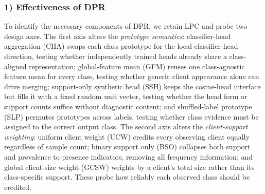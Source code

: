 \documentclass[letterpaper]{article} %
\begin{document}
\subsubsection{1) Effectiveness of DPR}
To identify the necessary components of DPR, we retain LPC and probe two design axes. The first axis alters the \emph{prototype semantics}: classifier-head aggregation (CHA) swaps each class prototype for the local classifier-head direction, testing whether independently trained heads already share a class-aligned representation; global-feature mean (GFM) reuses one class-agnostic feature mean for every class, testing whether generic client appearance alone can drive merging; support-only synthetic head (SSH) keeps the cosine-head interface but fills it with a fixed random unit vector, testing whether the head form or support counts suffice without diagnostic content; and shuffled-label prototype (SLP) permutes prototypes across labels, testing whether class evidence must be assigned to the correct output class. The second axis alters the \emph{client-support weighting}: uniform client weight (UCW) credits every observing client equally regardless of sample count; binary support only (BSO) collapses both support and prevalence to presence indicators, removing all frequency information; and global client-size weight (GCSW) weights by a client's total size rather than its class-specific support. These probe how reliably each observed class should be credited.
\end{document}
